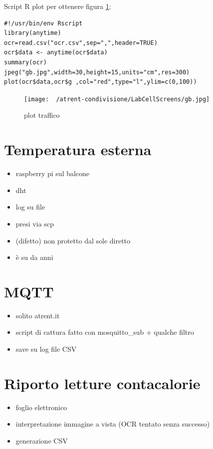 \documentclass[a4paper,12pt]{article}
\begin{document}
Script R plot per ottenere figura \ref{fig:plottraffico}:
\begin{lstlisting}
#!/usr/bin/env Rscript
library(anytime)
ocr=read.csv("ocr.csv",sep=",",header=TRUE)
ocr$data <- anytime(ocr$data)
summary(ocr)
jpeg("gb.jpg",width=30,height=15,units="cm",res=300)
plot(ocr$data,ocr$g ,col="red",type="l",ylim=c(0,100))
\end{lstlisting}

\begin{figure}
	\centering
	\texttt{[image: ~/atrent-condivisione/LabCellScreens/gb.jpg]}
	\caption{plot traffico}
	\label{fig:plottraffico}
\end{figure}




\section{Temperatura esterna}
\begin{itemize}
\item raspberry pi sul balcone
\item dht
\item log su file
\item presi via scp
\item (difetto) non protetto dal sole diretto
\item è su da anni
\end{itemize}

\section{MQTT}
\begin{itemize}
	\item solito atrent.it
	\item script di cattura fatto con mosquitto\_sub +  qualche filtro
	\item save su log file CSV
\end{itemize}


\section{Riporto letture contacalorie}
\begin{itemize}
\item foglio elettronico
\item interpretazione immagine a vista (OCR tentato senza successo)
\item generazione CSV
\end{itemize}
\end{document}
